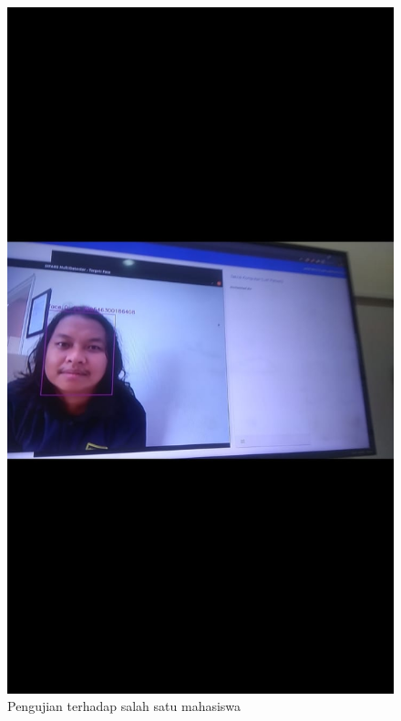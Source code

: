 \begin{figure} [p] \centering
    \includegraphics[scale=0.2]{gambar/ekadetect0.jpeg}
    \caption{Pengujian terhadap salah satu mahasiswa}
    \label{fig:SfEkadetect0}
\end{figure}

% 

